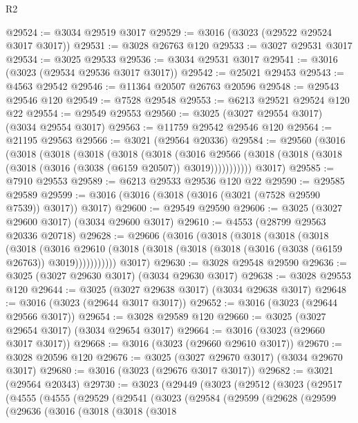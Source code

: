 \begin{lexlean}{R2}
\begin{coremodule}
@29524 := @3034 @29519 @3017
@29529 := @3016 (@3023 (@29522 @29524 @3017 @3017))
@29531 := @3028 @26763 @120
@29533 := @3027 @29531 @3017
@29534 := @3025 @29533
@29536 := @3034 @29531 @3017
@29541 := @3016 (@3023 (@29534 @29536 @3017 @3017))
@29542 := @25021 @29453
@29543 := @4563 @29542
@29546 := @11364 @20507 @26763 @20596
@29548 := @29543 @29546 @120
@29549 := @7528 @29548
@29553 := @6213 @29521 @29524 @120 @22
@29554 := @29549 @29553
@29560 := @3025 (@3027 @29554 @3017) (@3034 @29554 @3017)
@29563 := @11759 @29542 @29546 @120
@29564 := @21195 @29563
@29566 := @3021 (@29564 @20336)
@29584 := @29560
    (@3016
      (@3018
        (@3018
          (@3018
            (@3018
              (@3018
                (@3016
                  @29566
                  (@3018 (@3018 (@3018 (@3018 (@3016 (@3038 (@6159 @20507)) @3019)))))))))))
      @3017)
@29585 := @7910 @29553
@29589 := @6213 @29533 @29536 @120 @22
@29590 := @29585 @29589
@29599 := @3016 (@3016 (@3018 (@3016 (@3021 (@7528 @29590 @7539)) @3017)) @3017)
@29600 := @29549 @29590
@29606 := @3025 (@3027 @29600 @3017) (@3034 @29600 @3017)
@29610 := @4553 (@28799 @29563 @20336 @20718)
@29628 := @29606
    (@3016
      (@3018
        (@3018
          (@3018
            (@3018
              (@3018
                (@3016
                  @29610
                  (@3018 (@3018 (@3018 (@3018 (@3016 (@3038 (@6159 @26763)) @3019)))))))))))
      @3017)
@29630 := @3028 @29548 @29590
@29636 := @3025 (@3027 @29630 @3017) (@3034 @29630 @3017)
@29638 := @3028 @29553 @120
@29644 := @3025 (@3027 @29638 @3017) (@3034 @29638 @3017)
@29648 := @3016 (@3023 (@29644 @3017 @3017))
@29652 := @3016 (@3023 (@29644 @29566 @3017))
@29654 := @3028 @29589 @120
@29660 := @3025 (@3027 @29654 @3017) (@3034 @29654 @3017)
@29664 := @3016 (@3023 (@29660 @3017 @3017))
@29668 := @3016 (@3023 (@29660 @29610 @3017))
@29670 := @3028 @20596 @120
@29676 := @3025 (@3027 @29670 @3017) (@3034 @29670 @3017)
@29680 := @3016 (@3023 (@29676 @3017 @3017))
@29682 := @3021 (@29564 @20343)
@29730 := @3023
    (@29449
      (@3023
        (@29512
          (@3023
            (@29517
              (@4555
                (@4555
                  (@29529
                    (@29541
                      (@3023
                        (@29584
                          (@29599
                            (@29628
                              (@29599
                                (@29636
                                  (@3016
                                    (@3018
                                      (@3018
                                        (@3018

\end{coremodule}
\end{lexlean}
